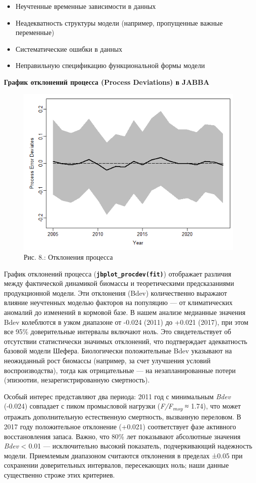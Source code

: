 \documentclass[
  letterpaper,
  DIV=11,
  numbers=noendperiod]{scrreprt}
\begin{document}
\begin{itemize}
\item
  Неучтенные временные зависимости в данных
\item
  Неадекватность структуры модели (например, пропущенные важные
  переменные)
\item
  Систематические ошибки в данных
\item
  Неправильную спецификацию функциональной формы модели
\end{itemize}

\textbf{График отклонений процесса (Process Deviations) в JABBA}

\begin{figure}[H]

{\centering \includegraphics[width=0.6\linewidth,height=\textheight,keepaspectratio]{images/JABBA8.PNG}

}

\caption{Рис. 8.: Отклонения процесса}

\end{figure}%

График отклонений процесса (\textbf{\texttt{jbplot\_procdev(fit)}})
отображает различия между фактической динамикой биомассы и
теоретическими предсказаниями продукционной модели. Эти отклонения
(Bdev) количественно выражают влияние неучтенных моделью факторов на
популяцию --- от климатических аномалий до изменений в кормовой базе. В
нашем анализе медианные значения Bdev колеблются в узком диапазоне от
-0.024 (2011) до +0.021 (2017), при этом все 95\% доверительные
интервалы включают ноль. Это свидетельствует об отсутствии статистически
значимых отклонений, что подтверждает адекватность базовой модели
Шефера. Биологически положительные Bdev указывают на неожиданный рост
биомассы (например, за счет улучшения условий воспроизводства), тогда
как отрицательные --- на незапланированные потери (эпизоотии,
незарегистрированную смертность).

Особый интерес представляют два периода: 2011 год с минимальным
\emph{Bdev} (-0.024) совпадает с пиком промысловой нагрузки
(\emph{F/F\textsubscript{msy}} ≈ 1.74), что может отражать
дополнительную естественную смертность, вызванную переловом. В 2017 году
положительное отклонение (+0.021) соответствует фазе активного
восстановления запаса. Важно, что 80\% лет показывают абсолютные
значения \emph{Bdev} \textless{} 0.01 --- исключительно высокий
показатель, подчеркивающий надежность модели. Приемлемым диапазоном
считаются отклонения в пределах ±0.05 при сохранении доверительных
интервалов, пересекающих ноль; наши данные существенно строже этих
критериев.
\end{document}
